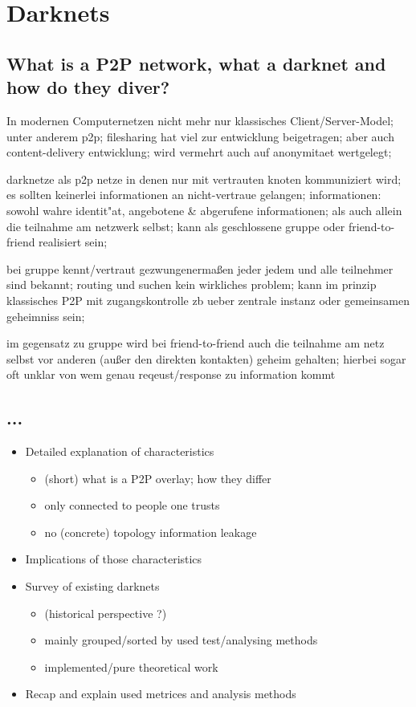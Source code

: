 \chapter{Darknets}

\section{What is a P2P network, what a darknet and how do they diver?}
In modernen Computernetzen nicht mehr nur klassisches Client/Server-Model; unter anderem p2p; filesharing hat viel zur entwicklung beigetragen; aber auch content-delivery entwicklung; wird vermehrt auch auf anonymitaet wertgelegt;

darknetze als p2p netze in denen nur mit vertrauten knoten kommuniziert wird; es sollten keinerlei informationen an nicht-vertraue gelangen; informationen: sowohl wahre identit"at, angebotene & abgerufene informationen; als auch allein die teilnahme am netzwerk selbst; kann als geschlossene gruppe oder friend-to-friend realisiert sein;

bei gruppe kennt/vertraut gezwungenermaßen jeder jedem und alle teilnehmer sind bekannt; routing und suchen kein wirkliches problem; kann im prinzip klassisches P2P mit zugangskontrolle zb ueber zentrale instanz oder gemeinsamen geheimniss sein;

im gegensatz zu gruppe wird bei friend-to-friend auch die teilnahme am netz selbst vor anderen (außer den direkten kontakten) geheim gehalten; hierbei sogar oft unklar von wem genau reqeust/response zu information kommt 


\section{...}
\begin{itemize}
\item    Detailed explanation of characteristics
\begin{itemize}
\item        (short) what is a P2P overlay; how they differ
\item        only connected to people one trusts
\item        no (concrete) topology information leakage
\end{itemize}
\item    Implications of those characteristics
\item    Survey of existing darknets
\begin{itemize}
\item        (historical perspective ?)
\item        mainly grouped/sorted by used test/analysing methods
\item        implemented/pure theoretical work
\end{itemize}
\item    Recap and explain used metrices and analysis methods
\end{itemize}
